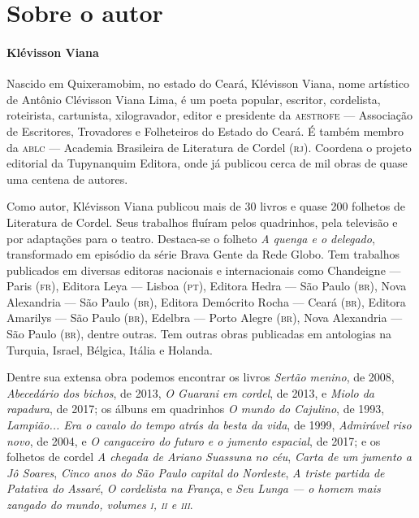 \documentclass[11pt]{extarticle}
\begin{document}
\reversemarginpar
\marginparwidth=5cm


\section{Sobre o autor}

\paragraph{Klévisson Viana}

Nascido em Quixeramobim, no estado do Ceará, Klévisson Viana, nome artístico de Antônio 
Clévisson Viana Lima, é um poeta popular, escritor, cordelista, roteirista, cartunista, 
xilogravador, editor e presidente da \textsc{aestrofe} --- Associação de Escritores, 
Trovadores e Folheteiros do Estado do Ceará. É também membro da \textsc{ablc} --- Academia 
Brasileira de Literatura de Cordel (\textsc{rj}). Coordena o projeto editorial da 
Tupynanquim Editora, onde já publicou cerca de mil obras de quase uma centena de autores. 

Como autor, Klévisson Viana publicou mais de 30 livros e quase 200 folhetos de 
Literatura de Cordel. Seus trabalhos fluíram pelos quadrinhos, pela televisão e por 
adaptações para o teatro. Destaca-se o folheto \textit{A quenga e o delegado}, transformado 
em episódio da série Brava Gente da Rede Globo. Tem trabalhos publicados em diversas 
editoras nacionais e internacionais como Chandeigne --- Paris (\textsc{fr}), Editora Leya 
--- Lisboa (\textsc{pt}), Editora Hedra --- São Paulo (\textsc{br}), Nova Alexandria --- 
São Paulo (\textsc{br}), Editora Demócrito Rocha --- Ceará (\textsc{br}), 
Editora Amarilys --- São Paulo (\textsc{br}), Edelbra --- Porto Alegre (\textsc{br}), 
Nova Alexandria --- São Paulo (\textsc{br}), dentre outras. Tem outras obras publicadas 
em antologias na Turquia, Israel, Bélgica, Itália e Holanda. 



Dentre sua extensa obra podemos encontrar os livros \textit{Sertão menino}, de 2008, 
\textit{Abecedário dos bichos}, de 2013, \textit{O Guarani em cordel}, de 2013, e 
\textit{Miolo da rapadura}, de 2017; os álbuns em quadrinhos \textit{O mundo do Cajulino}, 
de 1993, \textit{Lampião... Era o cavalo do tempo atrás da besta da vida}, de 1999, 
\textit{Admirável riso novo}, de 2004, e \textit{O cangaceiro do futuro e o jumento espacial}, 
de 2017; e os folhetos de cordel \textit{A chegada de Ariano Suassuna no céu}, 
\textit{Carta de um jumento a Jô Soares}, \textit{Cinco anos do São Paulo capital do Nordeste}, 
\textit{A triste partida de Patativa do Assaré}, \textit{O cordelista na França}, e 
\textit{Seu Lunga --- o homem mais zangado do mundo, volumes \textsc{i}, \textsc{ii} e \textsc{iii}}.
\end{document}
